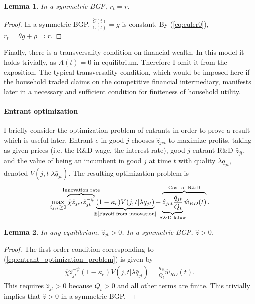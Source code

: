 \documentclass[11pt,english]{article}
\newtheorem{lemma}{Lemma}
\theoremstyle{definition}
\begin{document}
\begin{lemma}\label{lemma:constant_interest_rate}
	In a symmetric BGP, $r_t = r$.
\end{lemma}

\begin{proof}
	In a symmetric BGP, $\frac{\dot{C}(t)}{C(t)} = g$ is constant. By (\ref{eq:euler0}), $r_t = \theta g + \rho \eqqcolon r$.
\end{proof}

Finally, there is a transversality condition on financial wealth. In this model it holds trivially, as $A(t) = 0$ in equilibrium. Therefore I omit it from the exposition. The typical transversality condition, which would be imposed here if the household traded claims on the competitive financial intermediary, manifests later in a necessary and sufficient condition for finiteness of household utility.

\paragraph{Entrant optimization}

I briefly consider the optimization problem of entrants in order to prove a result which is useful later. Entrant $e$ in good $j$ chooses $\hat{z}_{jet}$ to maximize profits, taking as given prices (i.e. the R\&D wage, the interest rate), good $j$ entrant R\&D $\hat{z}_{jt}$, and the value of being an incumbent in good $j$ at time $t$ with quality $\lambda \bar{q}_{jt}$, denoted $V(j,t|\lambda \bar{q}_{jt})$. The resulting optimization problem is
\begin{align}
	\max_{\hat{z}_{jet} \ge 0} \overbrace{\hat{\chi} \hat{z}_{jet} \hat{z}_{jt}^{-\psi}}^{\mathclap{\text{Innovation rate}}} \underbrace{(1-\kappa_e) V(j,t|\lambda \bar{q}_{jt})}_{\mathclap{\mathbb{E}[\text{Payoff from innovation}]}} -  \overbrace{\underbrace{\hat{z}_{jet} \frac{\bar{q}_{jt}}{Q_t}}_{\mathclap{\text{R\&D labor}}} \hat{w}_{RD}(t)}^{\mathclap{\text{Cost of R\&D}}}. \label{eq:entrant_optimization_problem}
\end{align}

\begin{lemma}
	In any equilibrium, $\hat{z}_{jt} > 0$. In a symmetric BGP, $\hat{z} > 0$.  
\end{lemma} 

\begin{proof}	
	The first order condition corresponding to (\ref{eq:entrant_optimization_problem}) is given by
	\begin{align*}
		\hat{\chi} \hat{z}_{jt}^{-\psi} (1-\kappa_e) V(j,t|\lambda \bar{q}_{jt}) = \frac{\bar{q}_{jt}}{Q_t} \hat{w}_{RD}(t).
	\end{align*}
	This requires $\hat{z}_{jt} > 0$ because $Q_t > 0$ and all other terms are finite. This trivially implies that $\hat{z} > 0$ in a symmetric BGP. 
\end{proof}
\end{document}
